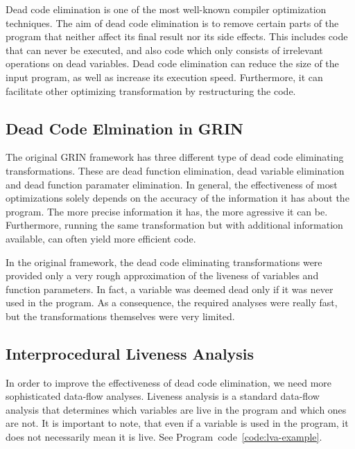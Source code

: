 \documentclass[main.tex]{subfiles}
\begin{document}
	
	Dead code elimination is one of the most well-known compiler optimization techniques. The aim of dead code elimination is to remove certain parts of the program that neither affect its final result nor its side effects. This includes code that can never be executed, and also code which only consists of irrelevant operations on dead variables. Dead code elimination can reduce the size of the input program, as well as increase its execution speed. Furthermore, it can facilitate other optimizing transformation by restructuring the code.
	
	\subsection{Dead Code Elmination in GRIN}
	
	The original GRIN framework has three different type of dead code eliminating transformations. These are dead function elimination, dead variable elimination and dead function paramater elimination. In general, the effectiveness of most optimizations solely depends on the accuracy of the information it has about the program. The more precise information it has, the more agressive it can be. Furthermore, running the same transformation but with additional information available, can often yield more efficient code.
	
	In the original framework, the dead code eliminating transformations were provided only a very rough approximation of the liveness of variables and function parameters. In fact, a variable was deemed dead only if it was never used in the program. As a consequence, the required analyses were really fast, but the transformations themselves were very limited.
	
	\subsection{Interprocedural Liveness Analysis} \label{sub-sec:lva}
	
	In order to improve the effectiveness of dead code elimination, we need more sophisticated data-flow analyses. Liveness analysis is a standard data-flow analysis that determines which variables are live in the program and which ones are not. It is important to note, that even if a variable is used in the program, it does not necessarily mean it is live. See Program~code~\ref{code:lva-example}.
	
\end{document}
